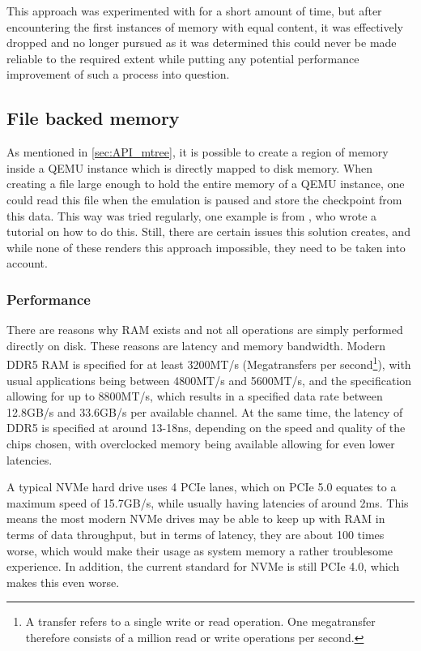 This approach was experimented with for a short amount of time,
but after encountering the first instances of memory with equal content,
it was effectively dropped and no longer pursued
as it was determined this could never be made reliable to the required extent
while putting any potential performance improvement of such a process into question.

\subsection{File backed memory}
As mentioned in \autoref{sec:API_mtree},
it is possible to create a region of memory inside a QEMU instance
which is directly mapped to disk memory.
When creating a file large enough to hold the entire memory of a QEMU instance,
one could read this file when the emulation is paused and store the checkpoint from this data.
This way was tried regularly, one example is from ,
who wrote a tutorial on how to do this\cite{QEMU_memory_file}.
Still, there are certain issues this solution creates,
and while none of these renders this approach impossible,
they need to be taken into account.

\subsubsection{Performance}
There are reasons why RAM exists and not all operations are simply performed directly on disk.
These reasons are latency and memory bandwidth.
Modern DDR5 RAM is specified for at least 3200MT/s (Megatransfers per second\footnote{A transfer refers to a single write or read operation. One megatransfer therefore consists of a million read or write operations per second.}),
with usual applications being between 4800MT/s and 5600MT/s,
and the specification allowing for up to 8800MT/s,
which results in a specified data rate between 12.8GB/s and 33.6GB/s per available channel.
At the same time, the latency of DDR5 is specified at around 13-18ns,
depending on the speed and quality of the chips chosen,
with overclocked memory being available allowing for even lower latencies\cite[p.392-406]{JEDEC}.

A typical NVMe hard drive uses 4 PCIe lanes, which on PCIe 5.0 equates to a maximum speed of 15.7GB/s,
while usually having latencies of around 2ms.
This means the most modern NVMe drives may be able to keep up with RAM in terms of data throughput,
but in terms of latency, they are about 100 times worse,
which would make their usage as system memory a rather troublesome experience.
In addition, the current standard for NVMe is still PCIe 4.0, which makes this even worse.

